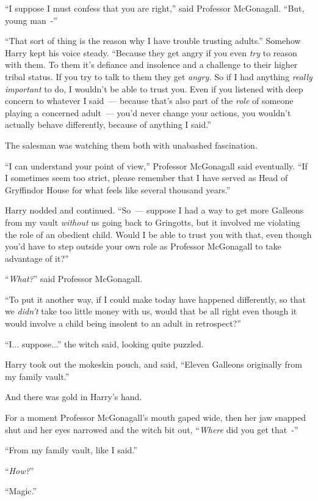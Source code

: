 ``I suppose I must confess that you are right,'' said Professor McGonagall. ``But, young man~-''

``That sort of thing is the reason why I have trouble trusting adults.'' Somehow Harry kept his voice steady. ``Because they get angry if you even \emph{try} to reason with them. To them it's defiance and insolence and a challenge to their higher tribal status. If you try to talk to them they get \emph{angry.} So if I had anything \emph{really} \emph{important} to do, I wouldn't be able to trust you. Even if you listened with deep concern to whatever I said~--- because that's also part of the \emph{role} of someone playing a concerned adult~--- you'd never change your actions, you wouldn't actually behave differently, because of anything I said.''

The salesman was watching them both with unabashed fascination.

``I can understand your point of view,'' Professor McGonagall said eventually. ``If I sometimes seem too strict, please remember that I have served as Head of Gryffindor House for what feels like several thousand years.''

Harry nodded and continued. ``So~--- suppose I had a way to get more Galleons from my vault \emph{without} us going back to Gringotts, but it involved me violating the role of an obedient child. Would I be able to trust you with that, even though you'd have to step outside your own role as Professor McGonagall to take advantage of it?''

``\emph{What?}'' said Professor McGonagall.

``To put it another way, if I could make today have happened differently, so that we \emph{didn't} take too little money with us, would that be all right even though it would involve a child being insolent to an adult in retrospect?''

``I... suppose...'' the witch said, looking quite puzzled.

Harry took out the mokeskin pouch, and said, ``Eleven Galleons originally from my family vault.''

And there was gold in Harry's hand.

For a moment Professor McGonagall's mouth gaped wide, then her jaw snapped shut and her eyes narrowed and the witch bit out, ``\emph{Where} did you get that~-''

``From my family vault, like I said.''

``\emph{How?}''

``Magic.''

